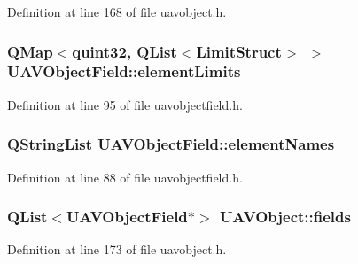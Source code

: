 \-Definition at line 168 of file uavobject.\-h.

\hypertarget{group___u_a_v_objects_plugin_ga16abb7c1b891411815fe34473448b9ce}{
\subsubsection[{element\-Limits}]{\setlength{\rightskip}{0pt plus 5cm}\-Q\-Map$<$quint32, \-Q\-List$<$\-Limit\-Struct$>$ $>$ {\bf \-U\-A\-V\-Object\-Field\-::element\-Limits}}}\label{group___u_a_v_objects_plugin_ga16abb7c1b891411815fe34473448b9ce}


\-Definition at line 95 of file uavobjectfield.\-h.

\hypertarget{group___u_a_v_objects_plugin_ga5849334da3325c4cac8625bb5910d57d}{
\subsubsection[{element\-Names}]{\setlength{\rightskip}{0pt plus 5cm}\-Q\-String\-List {\bf \-U\-A\-V\-Object\-Field\-::element\-Names}}}\label{group___u_a_v_objects_plugin_ga5849334da3325c4cac8625bb5910d57d}


\-Definition at line 88 of file uavobjectfield.\-h.

\hypertarget{group___u_a_v_objects_plugin_gaafc65699167bc5cedfd058400e484df6}{
\subsubsection[{fields}]{\setlength{\rightskip}{0pt plus 5cm}\-Q\-List$<${\bf \-U\-A\-V\-Object\-Field}$\ast$$>$ {\bf \-U\-A\-V\-Object\-::fields}}}\label{group___u_a_v_objects_plugin_gaafc65699167bc5cedfd058400e484df6}


\-Definition at line 173 of file uavobject.\-h.

